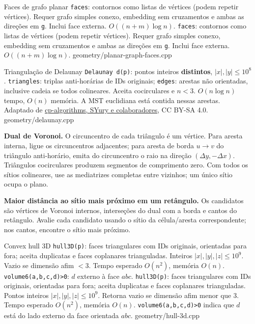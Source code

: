 \ifextended

\templateentry
{Faces de grafo planar}
{\texttt{faces}: contornos como listas de vértices (podem repetir vértices). Requer grafo simples conexo, embedding sem cruzamentos e ambas as direções em \texttt{g}. Inclui face externa. $O((n+m)\log n)$.}
{\texttt{faces}: contornos como listas de vértices (podem repetir vértices). Requer grafo simples conexo, embedding sem cruzamentos e ambas as direções em \texttt{g}. Inclui face externa. $O((n+m)\log n)$.}
{geometry/planar-graph-faces.cpp}

\fi

\ifextended
\templateentry
{Triangulação de Delaunay}
{}
{\texttt{Delaunay d(p)}: pontos inteiros \textbf{distintos}, $|x|,|y|\le10^8$. \texttt{triangles}: triplas anti-horárias de IDs originais; \texttt{edges}: arestas não orientadas, inclusive cadeia se todos colineares. Aceita cocirculares e $n<3$. $O(n\log n)$ tempo, $O(n)$ memória. A MST euclidiana está contida nessas arestas. Adaptado de \href{https://cp-algorithms.com/geometry/delaunay.html}{cp-algorithms, SYury e colaboradores}, CC BY-SA 4.0.}
{geometry/delaunay.cpp}
\fi

\ifextended
\textbf{Dual de Voronoi.} O circuncentro de cada triângulo é um vértice. Para aresta interna, ligue os circuncentros adjacentes; para aresta de borda $u\to v$ do triângulo anti-horário, emita do circuncentro o raio na direção $(\Delta y,-\Delta x)$. Triângulos cocirculares produzem segmentos de comprimento zero. Com todos os sítios colineares, use as mediatrizes completas entre vizinhos; um único sítio ocupa o plano.

\textbf{Maior distância ao sítio mais próximo em um retângulo.} Os candidatos são vértices de Voronoi internos, interseções do dual com a borda e cantos do retângulo. Avalie cada candidato usando o sítio da célula/aresta correspondente; nos cantos, encontre o sítio mais próximo.
\fi

\templateentry
{Convex hull 3D}
{\texttt{hull3D(p)}: faces triangulares com IDs originais, orientadas para fora; aceita duplicatas e faces coplanares trianguladas. Inteiros $|x|,|y|,|z|\le10^9$. Vazio se dimensão afim $<3$. Tempo esperado $O(n^2)$, memória $O(n)$. \texttt{volume6(a,b,c,d)>0}: $d$ externo à face $abc$.}
{\texttt{hull3D(p)}: faces triangulares com IDs originais, orientadas para fora; aceita duplicatas e faces coplanares trianguladas. Pontos inteiros $|x|,|y|,|z|\le10^9$. Retorna vazio se dimensão afim menor que 3. Tempo esperado $O(n^2)$, memória $O(n)$. \texttt{volume6(a,b,c,d)>0} indica que $d$ está do lado externo da face orientada $abc$.}
{geometry/hull-3d.cpp}
